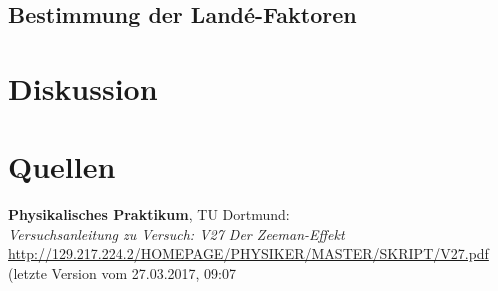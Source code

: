 \documentclass[captions=tableheading]{scrartcl}
\begin{document}
\subsection{Bestimmung der Landé-Faktoren}


\section{Diskussion}

\section{Quellen}
\begin{enumerate}[label={[\arabic*]}]
\item \label{q:anleitung} \textbf{Physikalisches Praktikum}, TU Dortmund: \\
\textit{Versuchsanleitung zu Versuch: V27 Der Zeeman-Effekt} \\
\url{http://129.217.224.2/HOMEPAGE/PHYSIKER/MASTER/SKRIPT/V27.pdf} (letzte Version vom 27.03.2017, 09:07
\end{enumerate}
\end{document}
